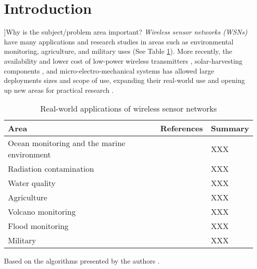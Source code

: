 \section{Introduction}

\todo[inline]]{Why is the subject/problem area important?}
\textit{Wireless sensor networks (WSNs)} have many applications and research studies in areas such as environmental monitoring, agriculture, and military uses (See Table \ref{table:applications}). More recently, the availability and lower cost of low-power wireless transmitters \citep{902661}, solar-harvesting components \citep{Prauzek2018}, and micro-electro-mechanical systems \citep{1045391} has allowed large deployments sizes and scope of use, expanding their real-world use and opening up new areas for practical research \citep{Kandris2020}.

\begin{table}[h]
	\footnotesize
\begin{tabular}{|p{}|p{}|p{}|}
\hline
Area & References & Summary \\
\hline
Ocean monitoring and the marine environment & \cite{Mahdy2008a, Albaladejo2010, 6973877} & XXX \\
Radiation contamination & \cite{Gomez2015} & XXX \\
 Water quality & \cite{Fang2010} & XXX \\
Agriculture  & \cite{8745854} & XXX \\
Volcano monitoring  & \cite{Werner-Allen2006} & XXX \\
Flood monitoring  & \cite{Castillo-effen2004} & XXX \\
Military & \cite{6268958} & XXX \\
\hline
\end{tabular}
\caption{Real-world applications of wireless sensor networks}
\label{table:applications}	
\end{table}



Based on the algorithms presented by the authors \citep{creech2021dynamic, creech2021resource}.



